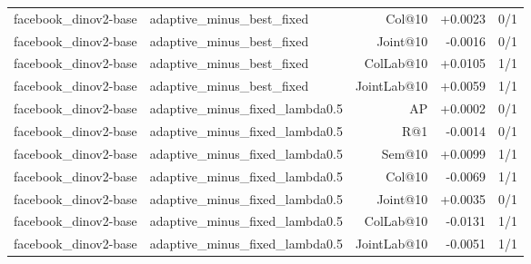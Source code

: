 \begin{table}[t]
{\begin{tabular}{llrrr}
facebook\_dinov2-base & adaptive\_minus\_best\_fixed & Col@10 & +0.0023 & 0/1 \\
facebook\_dinov2-base & adaptive\_minus\_best\_fixed & Joint@10 & -0.0016 & 0/1 \\
facebook\_dinov2-base & adaptive\_minus\_best\_fixed & ColLab@10 & +0.0105 & 1/1 \\
facebook\_dinov2-base & adaptive\_minus\_best\_fixed & JointLab@10 & +0.0059 & 1/1 \\
facebook\_dinov2-base & adaptive\_minus\_fixed\_lambda0.5 & AP & +0.0002 & 0/1 \\
facebook\_dinov2-base & adaptive\_minus\_fixed\_lambda0.5 & R@1 & -0.0014 & 0/1 \\
facebook\_dinov2-base & adaptive\_minus\_fixed\_lambda0.5 & Sem@10 & +0.0099 & 1/1 \\
facebook\_dinov2-base & adaptive\_minus\_fixed\_lambda0.5 & Col@10 & -0.0069 & 1/1 \\
facebook\_dinov2-base & adaptive\_minus\_fixed\_lambda0.5 & Joint@10 & +0.0035 & 0/1 \\
facebook\_dinov2-base & adaptive\_minus\_fixed\_lambda0.5 & ColLab@10 & -0.0131 & 1/1 \\
facebook\_dinov2-base & adaptive\_minus\_fixed\_lambda0.5 & JointLab@10 & -0.0051 & 1/1 \\
\bottomrule\end{tabular}}
\end{table}